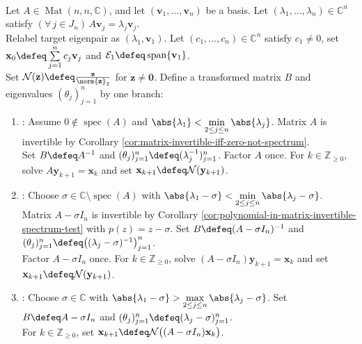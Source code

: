 \begin{computationmethod} \label{meth:inverse-and-shifted-power-iteration-preview} \\
Let $A\in\operatorname{Mat}(n,n,\mathbb{C})$, and let $(\mathbf{v}_1,\ldots,\mathbf{v}_n)$ be a basis. Let $(\lambda_1,\ldots,\lambda_n)\in\mathbb{C}^n$ satisfy $(\forall\,j\in J_n)\,A\mathbf{v}_j=\lambda_j\mathbf{v}_j$.\\
Relabel target eigenpair as $(\lambda_1,\mathbf{v}_1)$. Let $(c_1,\ldots,c_n)\in\mathbb{C}^n$ satisfy $c_1\neq0$, set $\mathbf{x}_0\defeq\sum\limits_{j=1}^{n}c_j\mathbf{v}_j$ and $\mathcal{E}_1\defeq\operatorname{span}\{\mathbf{v}_1\}$.\\
Set $\mathcal{N}(\mathbf{z})\defeq\frac{\mathbf{z}}{\norm{\mathbf{z}}_2}$ for $\mathbf{z}\neq\mathbf{0}$. Define a transformed matrix $B$ and eigenvalues $(\theta_j)_{j=1}^{n}$ by one branch:
\begin{enumerate}[label=(\roman*)]
\setlength{\itemsep}{0pt}
\item {}: Assume $0\notin\operatorname{spec}(A)$ and $\abs{\lambda_1}<\min\limits_{2\leq j\leq n}\abs{\lambda_j}$. Matrix $A$ is invertible by Corollary \ref{cor:matrix-invertible-iff-zero-not-spectrum}.\\
Set $B\defeq A^{-1}$ and $(\theta_j)_{j=1}^{n}\defeq(\lambda_j^{-1})_{j=1}^{n}$. Factor $A$ once. For $k\in\mathbb{Z}_{\geq0}$, solve $A\mathbf{y}_{k+1}=\mathbf{x}_k$ and set $\mathbf{x}_{k+1}\defeq\mathcal{N}(\mathbf{y}_{k+1})$.
\item {}: Choose $\sigma\in\mathbb{C}\setminus\operatorname{spec}(A)$ with $\abs{\lambda_1-\sigma}<\min\limits_{2\leq j\leq n}\abs{\lambda_j-\sigma}$.\\
Matrix $A-\sigma I_n$ is invertible by Corollary \ref{cor:polynomial-in-matrix-invertible-spectrum-test} with $p(z)=z-\sigma$. Set $B\defeq(A-\sigma I_n)^{-1}$ and $(\theta_j)_{j=1}^{n}\defeq\bigl((\lambda_j-\sigma)^{-1}\bigr)_{j=1}^{n}$.\\
Factor $A-\sigma I_n$ once. For $k\in\mathbb{Z}_{\geq0}$, solve $(A-\sigma I_n)\mathbf{y}_{k+1}=\mathbf{x}_k$ and set $\mathbf{x}_{k+1}\defeq\mathcal{N}(\mathbf{y}_{k+1})$.
\item {}: Choose $\sigma\in\mathbb{C}$ with $\abs{\lambda_1-\sigma}>\max\limits_{2\leq j\leq n}\abs{\lambda_j-\sigma}$. Set $B\defeq A-\sigma I_n$ and $(\theta_j)_{j=1}^{n}\defeq(\lambda_j-\sigma)_{j=1}^{n}$.\\
For $k\in\mathbb{Z}_{\geq0}$, set $\mathbf{x}_{k+1}\defeq\mathcal{N}\bigl((A-\sigma I_n)\mathbf{x}_k\bigr)$.

\end{enumerate}
\end{computationmethod}
